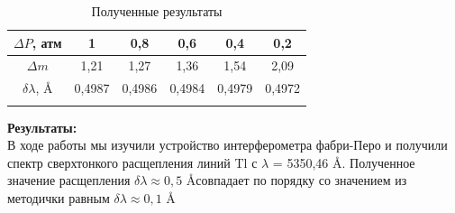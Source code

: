 \documentclass[a4paper, 12pt]{article}%
\begin{document}
	\begin{longtable}{|c|c|c|c|c|c|}
 		\hline
 		$\Delta P$, атм & 1 & 0,8 & 0,6 & 0,4 & 0,2  \\ \hline
 		$\Delta m$	& 1,21 & 1,27 & 1,36 & 1,54 & 2,09  \\ \hline
 		$ \delta \lambda $, \AA & 0,4987 & 0,4986 & 0,4984 & 0,4979 & 0,4972 \\ \hline
 		\caption{Полученные результаты}
 	\end{longtable}

	\textbf{Результаты: }\\
	
	В ходе работы мы изучили устройство интерферометра фабри-Перо и получили спектр сверхтонкого расщепления линий Tl с $\lambda$ = 5350,46 \AA. Полученное значение расщепления $\delta \lambda \approx 0,5$ \AA  совпадает по порядку со значением из методички равным $\delta \lambda \approx 0,1$ \AA
	
\end{document}
